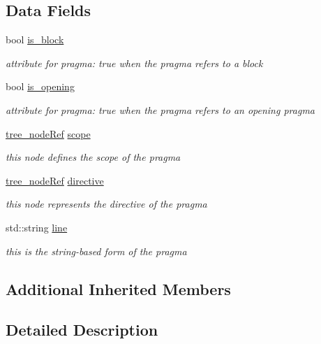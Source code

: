 \subsection*{Data Fields}
\begin{DoxyCompactItemize}
\item 
bool \hyperlink{structgimple__pragma_a4c12869ebdf5503feb31ef838c9d44e4}{is\+\_\+block}
\begin{DoxyCompactList}\small\item\em attribute for pragma\+: true when the pragma refers to a block \end{DoxyCompactList}\item 
bool \hyperlink{structgimple__pragma_ac64ace3a205adb470b3dfc5045a9f108}{is\+\_\+opening}
\begin{DoxyCompactList}\small\item\em attribute for pragma\+: true when the pragma refers to an opening pragma \end{DoxyCompactList}\item 
\hyperlink{tree__node_8hpp_a6ee377554d1c4871ad66a337eaa67fd5}{tree\+\_\+node\+Ref} \hyperlink{structgimple__pragma_a4ea6da3c9261760add67d5e5a243b18e}{scope}
\begin{DoxyCompactList}\small\item\em this node defines the scope of the pragma \end{DoxyCompactList}\item 
\hyperlink{tree__node_8hpp_a6ee377554d1c4871ad66a337eaa67fd5}{tree\+\_\+node\+Ref} \hyperlink{structgimple__pragma_aa642b5dac7ec2b18b1be78830e6aedf1}{directive}
\begin{DoxyCompactList}\small\item\em this node represents the directive of the pragma \end{DoxyCompactList}\item 
std\+::string \hyperlink{structgimple__pragma_abe7cf41e8ef1815e3a1622a00a38efa1}{line}
\begin{DoxyCompactList}\small\item\em this is the string-\/based form of the pragma \end{DoxyCompactList}\end{DoxyCompactItemize}
\subsection*{Additional Inherited Members}


\subsection{Detailed Description}


